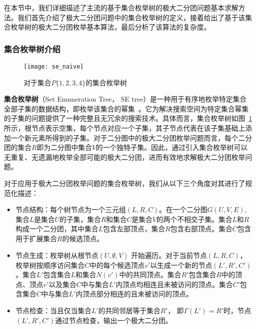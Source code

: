   在本节中，我们详细描述了主流的基于集合枚举树的极大二分团问题基本求解方法。我们首先介绍了极大二分团问题中的集合枚举树的定义，接着给出了基于该集合枚举树的极大二分团枚举基本算法，最后分析了该算法的复杂度。

\subsubsection{集合枚举树介绍}
\label{subsec:se}

\begin{figure} [ht]
  \centering
  \texttt{[image: se\_naive]}
  \vspace{0.1 in}
  \caption{对于集合$P\{1,2,3,4\}$的集合枚举树}
  \label{fig:se_naive}
\end{figure}


\textbf{集合枚举树}（Set Enumeration Tree， SE tree）是一种用于有序地枚举特定集合全部子集的数据结构，即枚举该集合的幂集~\cite{SEtree92}。它为解决搜索空间为特定集合幂集的子集的问题提供了一种完整且无冗余的搜索技术。具体而言，集合枚举树如图~\ref{fig:se_naive} 所示，根节点表示空集，每个节点对应一个子集，其子节点代表在该子集基础上添加一个新元素所得到的子集。对于二分图中的极大二分团枚举问题而言，每个二分团的集合$R$即为二分图中集合$V$的一个独特子集。因此，通过引入集合枚举树可以无重复、无遗漏地枚举全部可能的极大二分团，进而有效地求解极大二分团枚举问题。

对于应用于极大二分团枚举问题的集合枚举树，我们从以下三个角度对其进行了规范化描述：

\begin{itemize}
  \item 节点结构：每个树节点为一个三元组$(L,R,C)$。在一个二分图$G(U,V,E)$,集合$L$是集合$U$的子集，集合$R$和集合$C$是集合$V$的两个不相交子集。集合$L$和$R$构成一个二分团，其中集合$L$包含左部顶点，集合$R$包含右部顶点。集合$C$包含用于扩展集合$R$的候选顶点。
  \item 节点生成：枚举树从根节点$(U,\emptyset,V)$ 开始遍历。对于当前节点$(L,R,C)$，枚举树按顺序访问集合$C$中的每个候选顶点$v'$以生成一个新的节点$(L',R',C')$。集合$L'$包含集合$L$和集合$N(v')$中的共同顶点。集合$R'$包含集合$R$中的顶点、顶点$v'$以及集合$C$中与集合$L'$内顶点均相连且未被访问的顶点。集合$C'$包含集合$C$中与集合$L'$内顶点部分相连的且未被访问的顶点。
  \item 节点检查：当且仅当集合$L'$的共同邻居等于集合$R'$， 即$\Gamma(L')=R'$时，节点$(L',R',C')$通过节点检查，输出一个极大二分团。
\end{itemize}

